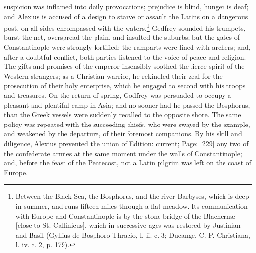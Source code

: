 suspicion was inflamed into daily provocations; prejudice is blind, hunger is deaf; and Alexius is accused of a design to starve or assault the Latins on a dangerous post, on all sides encompassed with the waters.\footnote{Between the Black Sea, the Bosphorus, and the river Barbyses, which is deep in summer, and runs fifteen miles through a flat meadow. Its communication with Europe and Constantinople is by the stone-bridge of the Blachernæ [close to St. Callinicus], which in successive ages was restored by Justinian and Basil (Gyllius de Bosphoro Thracio, l. ii. c. 3; Ducange, C. P. Christiana, l. iv. c. 2, p. 179).} Godfrey sounded his trumpets, burst the net, overspread the plain, and insulted the suburbs; but the gates of Constantinople were strongly fortified; the ramparts were lined with archers; and, after a doubtful conflict, both parties listened to the voice of peace and religion. The gifts and promises of the emperor insensibly soothed the fierce spirit of the Western strangers; as a Christian warrior, he rekindled their zeal for the prosecution of their holy enterprise, which he engaged to second with his troops and treasures. On the return of spring, Godfrey was persuaded to occupy a pleasant and plentiful camp in Asia; and no sooner had he passed the Bosphorus, than the Greek vessels were suddenly recalled to the opposite shore. The same policy was repeated with the succeeding chiefs, who were swayed by the example, and weakened by the departure, of their foremost companions. By his skill and diligence, Alexius prevented the union of Edition: current; Page: [229] any two of the confederate armies at the same moment under the walls of Constantinople; and, before the feast of the Pentecost, not a Latin pilgrim was left on the coast of Europe.

